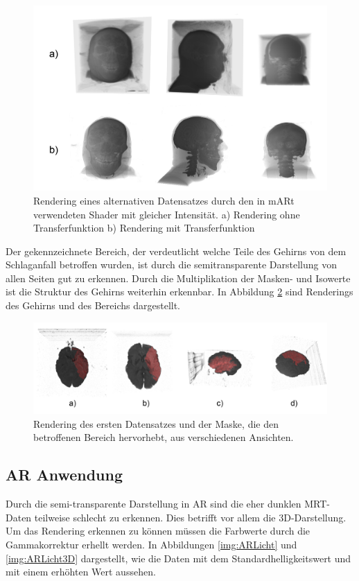 \begin{figure}[!htb]
	\centering
	\includegraphics[width=0.9\linewidth]{images/visMale_result.png}
	\caption{Rendering eines alternativen Datensatzes durch den in mARt verwendeten Shader mit gleicher Intensität. a) Rendering ohne Transferfunktion b) Rendering mit Transferfunktion}
	\label{img:resultsVisMale}
\end{figure}
\FloatBarrier

Der gekennzeichnete Bereich, der verdeutlicht welche Teile des Gehirns von dem Schlaganfall betroffen wurden, ist durch die semitransparente Darstellung von allen Seiten gut zu erkennen. 
Durch die Multiplikation der Masken- und Isowerte ist die Struktur des Gehirns weiterhin erkennbar. In Abbildung \ref{img:resultMask} sind Renderings des Gehirns und des Bereichs dargestellt.

\begin{figure}[!htb]
	\centering
	\includegraphics[width=0.99\linewidth]{images/mask_results.png}
	\caption{Rendering des ersten Datensatzes und der Maske, die den betroffenen Bereich hervorhebt, aus verschiedenen Ansichten.}
	\label{img:resultMask}
\end{figure}
\FloatBarrier
  
\subsection{AR Anwendung}
Durch die semi-transparente Darstellung in AR sind die eher dunklen MRT-Daten teilweise schlecht zu erkennen. Dies betrifft vor allem die 3D-Darstellung. Um das Rendering erkennen zu können müssen die Farbwerte durch die Gammakorrektur erhellt werden. In Abbildungen \ref{img:ARLicht} und \ref{img:ARLicht3D} dargestellt, wie die Daten mit dem Standardhelligkeitswert und mit einem erhöhten Wert aussehen.

